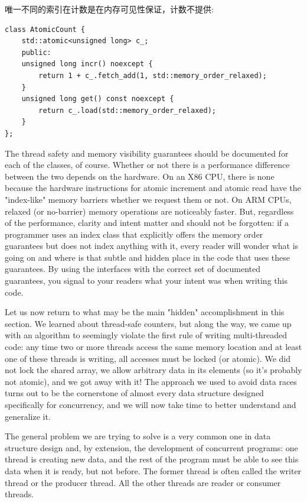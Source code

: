 唯一不同的索引在计数是在内存可见性保证，计数不提供:

\begin{lstlisting}[style=styleCXX]
class AtomicCount {
	std::atomic<unsigned long> c_;
	public:
	unsigned long incr() noexcept {
		return 1 + c_.fetch_add(1, std::memory_order_relaxed);
	}
	unsigned long get() const noexcept {
		return c_.load(std::memory_order_relaxed);
	}
};
\end{lstlisting}

The thread safety and memory visibility guarantees should be documented for each of the classes, of course. Whether or not there is a performance difference between the two depends on the hardware. On an X86 CPU, there is none because the hardware instructions for atomic increment and atomic read have the "index-like" memory barriers whether we request them or not. On ARM CPUs, relaxed (or no-barrier) memory operations are noticeably faster. But, regardless of the performance, clarity and intent matter and should not be forgotten: if a programmer uses an index class that explicitly offers the memory order guarantees but does not index anything with it, every reader will wonder what is going on and where is that subtle and hidden place in the code that uses these guarantees. By using the interfaces with the correct set of documented guarantees, you signal to your readers what your intent was when writing this code.

Let us now return to what may be the main "hidden" accomplishment in this section. We learned about thread-safe counters, but along the way, we came up with an algorithm to seemingly violate the first rule of writing multi-threaded code: any time two or more threads access the same memory location and at least one of these threads is writing, all accesses must be locked (or atomic). We did not lock the shared array, we allow arbitrary data in its elements (so it's probably not atomic), and we got away with it! The approach we used to avoid data races turns out to be the cornerstone of almost every data structure designed specifically for concurrency, and we will now take time to better understand and generalize it.


The general problem we are trying to solve is a very common one in data structure design and, by extension, the development of concurrent programs: one thread is creating new data, and the rest of the program must be able to see this data when it is ready, but not before. The former thread is often called the writer thread or the producer thread. All the other threads are reader or consumer threads.

